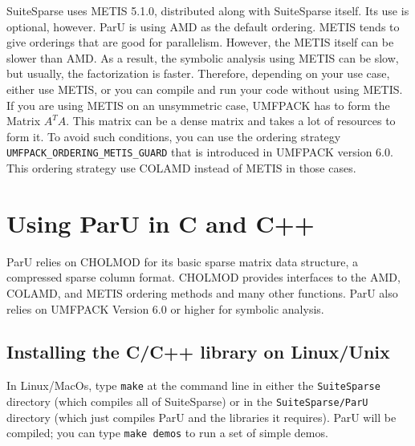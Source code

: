 \documentclass[12pt]{article}
\begin{document}
SuiteSparse uses METIS 5.1.0, distributed along with SuiteSparse itself.
Its use is optional, however. ParU is using AMD as the default ordering. METIS
tends to give orderings that are good for parallelism. However, the METIS itself
can be slower than AMD. As a result, the symbolic analysis using METIS can be slow, but
usually, the factorization is faster. Therefore, depending on your use case,
either use METIS, or you can compile and run your code without using METIS.
If you are using METIS on an unsymmetric case, UMFPACK has to form the Matrix
$A^{T}A$. This matrix can be a dense matrix and takes a lot of resources to form
it. To avoid such conditions, you can use the ordering strategy
\verb'UMFPACK_ORDERING_METIS_GUARD' that is introduced in UMFPACK version 6.0.
This ordering strategy use COLAMD instead of METIS in those cases.


\section{Using ParU in C and C++}

ParU relies on CHOLMOD for its basic sparse matrix data structure, a compressed 
sparse column format.  CHOLMOD provides interfaces to the AMD, COLAMD, and METIS
ordering methods and many other functions. ParU also relies on UMFPACK Version 
6.0 or higher for symbolic analysis. 


\subsection{Installing the C/C++ library on Linux/Unix}
In Linux/MacOs, type \verb'make' at the command line in either the 
\verb'SuiteSparse' directory (which compiles all of SuiteSparse) or in the 
\verb'SuiteSparse/ParU' directory (which just compiles ParU and the libraries 
it requires).  ParU will be compiled; you can type \verb'make demos' to run a
set of simple demos.
\end{document}

